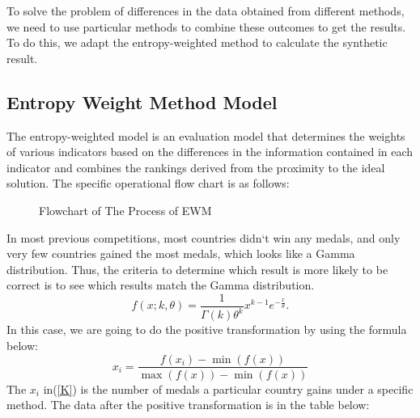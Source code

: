 \documentclass{mcmthesis}
\begin{document}
To solve the problem of differences in the data obtained from different methods, we need to use particular methods to combine these outcomes to get the results. To do this, we adapt the entropy-weighted method to calculate the synthetic result.

\subsection{Entropy Weight Method Model}
The entropy-weighted model is an evaluation model that determines the weights of various indicators based on the differences in the information contained in each indicator and combines the rankings derived from the proximity to the ideal solution. The specific operational flow chart is as follows:
\begin{figure}[H]
\centering
{}
\caption{Flowchart of The Process of EWM}
\label{fig:flowchart}
\end{figure}
In most previous competitions, most countries didn`t win any medals, and only very few countries gained the most medals, which looks like a Gamma distribution. Thus, the criteria to determine which result is more likely to be correct is to see which results match the Gamma distribution.\\
\begin{equation}\label{eq:1}
f(x;k,\theta) =\frac{1}{\Gamma(k) \theta^k}x^{k-1}e^{-\frac{x}{\theta}}.
\end{equation}
In this case, we are going to do the positive transformation by using the formula below:
\begin{equation}\label{K}
x_i = \frac{f(x_i) - \min(f(x))}{\max(f(x)) - \min(f(x))}
\end{equation}
The $x_i$ in(\ref{K}) is the number of medals a particular country gains under a specific method. The data after the positive transformation is in the table below:
\end{document}
